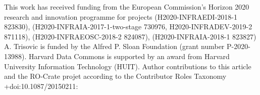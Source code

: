 \markdownRendererInterblockSeparator
{}\small\markdownRendererInterblockSeparator
{}This work has received funding from the European Commission's Horizon 2020 research and innovation programme for projects  (H2020-INFRAEDI-2018-1 823830),  (H2020-INFRAIA-2017-1-two-stage 730976, H2020-INFRADEV-2019-2 871118),  (H2020-INFRAEOSC-2018-2 824087),  (H2020-INFRAIA-2018-1 823827)\markdownRendererInterblockSeparator
{}A. Trisovic is funded by the Alfred P. Sloan Foundation (grant number P-2020-13988). Harvard Data Commons is supported by an award from Harvard University Information Technology (HUIT).\markdownRendererInterblockSeparator
{}\markdownRendererInterblockSeparator
{}Author contributions to this article and the RO-Crate projet according to the Contributor Roles Taxonomy  +{}{}{doi:10.1087/20150211}:\markdownRendererInterblockSeparator
{}\markdownRendererDlBegin
